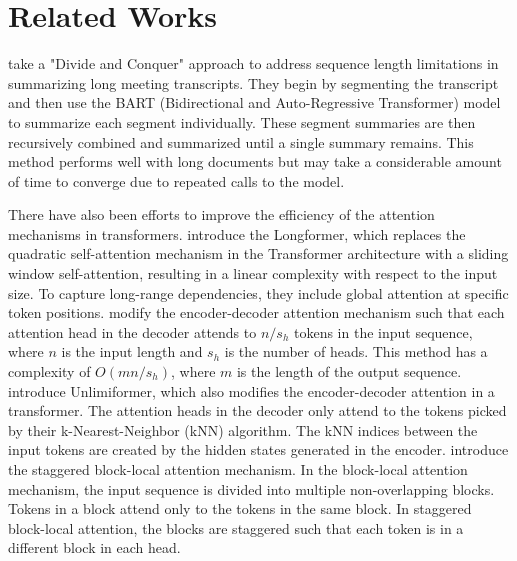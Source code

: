 \section{Related Works}
\label{sec:related-works}

\citet{golia2024action} take a "Divide and Conquer" approach to address sequence length limitations in summarizing long meeting transcripts.
They begin by segmenting the transcript and then use the BART (Bidirectional and Auto-Regressive Transformer) \cite{lewis-etal-2020-bart} model to summarize each segment individually.
These segment summaries are then recursively combined and summarized until a single summary remains.
This method performs well with long documents but may take a considerable amount of time to converge due to repeated calls to the model.

There have also been efforts to improve the efficiency of the attention mechanisms in transformers.
\citet{beltagy2020longformer} introduce the Longformer, which replaces the quadratic self-attention mechanism in the Transformer architecture with a sliding window self-attention, resulting in a linear complexity with respect to the input size.
To capture long-range dependencies, they include global attention at specific token positions.
\citet{huang-etal-2021-efficient} modify the encoder-decoder attention mechanism such that each attention head in the decoder attends to $n/s_h$ tokens in the input sequence, where $n$ is the input length and $s_h$ is the number of heads.
This method has a complexity of $O(mn/s_h)$, where $m$ is the length of the output sequence.
\citet{bertsch2023unlimiformer} introduce Unlimiformer, which also modifies the encoder-decoder attention in a transformer.
The attention heads in the decoder only attend to the tokens picked by their k-Nearest-Neighbor (kNN) algorithm.
The kNN indices between the input tokens are created by the hidden states generated in the encoder.
\citet{phang2022investigating} introduce the staggered block-local attention mechanism.
In the block-local attention mechanism, the input sequence is divided into multiple non-overlapping blocks.
Tokens in a block attend only to the tokens in the same block.
In staggered block-local attention, the blocks are staggered such that each token is in a different block in each head.

